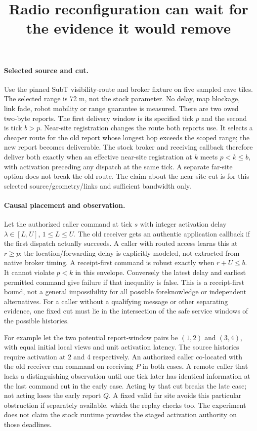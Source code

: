 \documentclass{article}
\begin{document}
\title{Radio reconfiguration can wait for the evidence it would remove}
\maketitle

\paragraph{Selected source and cut.}
Use the pinned SubT visibility-route and broker fixture on five
sampled cave tiles. The selected range is 72 m, not the stock
parameter. No delay, map blockage, link fade, robot mobility or
range guarantee is measured. There are two owed two-byte reports.
The first delivery window is its specified tick \(p\) and the
second is tick \(b>p\). Near-site registration changes the route
both reports use. It selects a cheaper route for the old report
whose longest hop exceeds the scoped range; the new report becomes
deliverable. The stock broker and receiving callback therefore
deliver both exactly when an effective near-site registration at
\(k\) meets \(p<k\le b\), with activation preceding any dispatch
at the same tick. A separate far-site option does not break the
old route. The claim about the near-site cut is for this selected
source/geometry/links and sufficient bandwidth only.

\paragraph{Causal placement and observation.}
Let the authorized caller command at tick \(s\) with integer
activation delay \(\lambda\in[L,U]\), \(1\le L\le U\). The
old receiver gets an authentic application callback if the
first dispatch actually succeeds. A caller with routed access
learns this at \(r\ge p\); the location/forwarding delay is
explicitly modeled, not extracted from native broker timing.
A receipt-first command is robust exactly when \(r+U\le b\).
It cannot violate \(p<k\) in this envelope. Conversely the
latest delay and earliest permitted command give failure if
that inequality is false. This is a receipt-first bound, not
a general impossibility for all possible foreknowledge or
independent alternatives. For a caller without a qualifying
message or other separating evidence, one fixed cut must lie
in the intersection of the safe service windows of the possible
histories.

For example let the two potential report-window pairs be \((1,2)\)
and \((3,4)\), with equal initial local views and unit activation
latency. The source histories require activation at 2 and 4
respectively. An authorized caller co-located with the old
receiver can command on receiving \(P\) in both cases. A remote
caller that lacks a distinguishing observation until one tick
later has identical information at the last command cut in the
early case. Acting by that cut breaks the late case; not acting
loses the early report \(Q\). A fixed valid far site avoids
this particular obstruction if separately available, which
the replay checks too. The experiment does not claim the
stock runtime provides the staged activation authority on
those deadlines.
\end{document}
